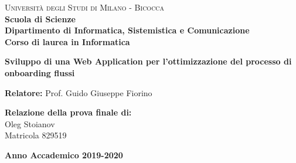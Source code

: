 \documentclass[corpo=11pt,numerazioneromana]{toptesi}
\begin{document}
\begin{titlepage}
        
        \noindent
        \begin{minipage}[t]{0.18\textwidth}
        \end{minipage}
        \begin{minipage}[t]{0.83\textwidth}
        {
                {\textsc{Università degli Studi di Milano - Bicocca}} \\
                \textbf{Scuola di Scienze} \\
                \textbf{Dipartimento di Informatica, Sistemistica e Comunicazione} \\
                \textbf{Corso di laurea in Informatica} \\
                \par
        }
        \end{minipage}
        
	\vspace{40mm}
        
	\begin{center}
            {\LARGE{
                    \textbf{Sviluppo di una Web Application per l’ottimizzazione del processo di onboarding flussi}
                    \par
            }}
        \end{center}
        
        \vspace{40mm}

        \noindent
        {\large \textbf{Relatore:} Prof. Guido Giuseppe Fiorino } \\

        
        \vspace{10mm}

        \begin{flushright}
            {\large \textbf{Relazione della prova finale di:}} \\
            \large{Oleg Stoianov} \\
            \large{Matricola 829519} 
        \end{flushright}
        
        \vspace{25mm}
        \begin{center}
            {\large{\bf Anno Accademico 2019-2020}}
        \end{center}

        \restoregeometry
        
\end{titlepage}
\end{document}
